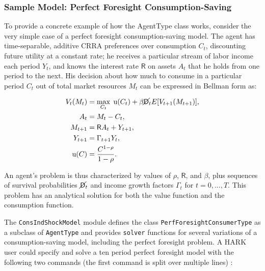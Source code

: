 \message{ !name(ccarroll_et_al_scipy_2018.tex)}\documentclass[10pt,twocolumn]{article}
\begin{document}
\subsubsection{Sample Model: Perfect Foresight
Consumption-Saving}\label{sample-model-perfect-foresight-consumption-saving}

To provide a concrete example of how the AgentType class works, consider
the very simple case of a perfect foresight consumption-saving model.
The agent has time-separable, additive CRRA preferences over consumption
\(C_t\), discounting future utility at a constant rate; he receives a
particular stream of labor income each period \(Y_t\), and knows the
interest rate \(\mathsf{R}\) on assets \(A_t\) that he holds from one
period to the next. His decision about how much to consume in a
particular period \(C_t\) out of total market resources \(M_t\) can be
expressed in Bellman form as:

\[
\begin{aligned}
V_t(M_t) &= \max_{C_t} \; \mathrm{u}(C_t)  + \beta  \cancel{\mathsf{D}}_t E [V_{t+1}(M_{t+1}) ], \\
A_t &= M_t - C_t, \\
M_{t+1} &= \mathsf{R} A_t + Y_{t+1}, \\
Y_{t+1} &= \Gamma_{t+1} Y_t, \\
\mathrm{u}(C) &= \frac{C^{1-\rho}}{1-\rho}.
\end{aligned}
\]

An agent's problem is thus characterized by values of \(\rho\),
\(\mathsf{R}\), and \(\beta\), plus sequences of survival probabilities
\(\cancel{\mathsf{D}}_t\) and income growth factors \(\Gamma_t\) for
\(t = 0, ... ,T\). This problem has an analytical solution for both the
value function and the consumption function.

The \texttt{ConsIndShockModel} module defines the class
\texttt{PerfForesightConsumerType} as a subclass of \texttt{AgentType}
and provides \texttt{solver} functions for several variations of a
consumption-saving model, including the perfect foresight problem. A
HARK user could specify and solve a ten period perfect foresight model
with the following two commands (the first command is split over
multiple lines) :
\end{document}
